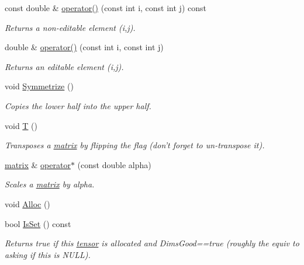\begin{DoxyCompactItemize}
const double \& \hyperlink{classJKBuilder_1_1SymmMatrix_a9ccbac42f4eefb704f04886001f4fb3e}{operator()} (const int i, const int j) const 
\begin{DoxyCompactList}\small\item\em Returns a non-\/editable element (i,j). \item\end{DoxyCompactList}\item 
double \& \hyperlink{classJKBuilder_1_1SymmMatrix_a3d7fca183ff1c9f4c160218746f2ef31}{operator()} (const int i, const int j)
\begin{DoxyCompactList}\small\item\em Returns an editable element (i,j). \item\end{DoxyCompactList}\item 
void \hyperlink{classJKBuilder_1_1SymmMatrix_ad1dc6c225dae96f6c5f8f91e5462c645}{Symmetrize} ()
\begin{DoxyCompactList}\small\item\em Copies the lower half into the upper half. \item\end{DoxyCompactList}\item 
void \hyperlink{classJKBuilder_1_1matrix_af2563817f6505e9f8a6ee5c5c209a115}{T} ()
\begin{DoxyCompactList}\small\item\em Transposes a \hyperlink{classJKBuilder_1_1matrix}{matrix} by flipping the flag (don't forget to un-\/transpose it). \item\end{DoxyCompactList}\item 
\hyperlink{classJKBuilder_1_1matrix}{matrix} \& \hyperlink{classJKBuilder_1_1matrix_ad4799cbe4a5d07c77f41857a3ce914a2}{operator$\ast$} (const double alpha)
\begin{DoxyCompactList}\small\item\em Scales a \hyperlink{classJKBuilder_1_1matrix}{matrix} by alpha. \item\end{DoxyCompactList}\item 
void \hyperlink{classJKBuilder_1_1tensor_a0ca5cbe96d2a61f06ae4b543ef84f166}{Alloc} ()
\item 
bool \hyperlink{classJKBuilder_1_1tensor_a79c9a36acc5dbeab94033ca97971dc09}{IsSet} () const 
\begin{DoxyCompactList}\small\item\em Returns true if this \hyperlink{classJKBuilder_1_1tensor}{tensor} is allocated and DimsGood==true (roughly the equiv to asking if this is NULL). \item\end{DoxyCompactList}\item 

\end{DoxyCompactItemize}
